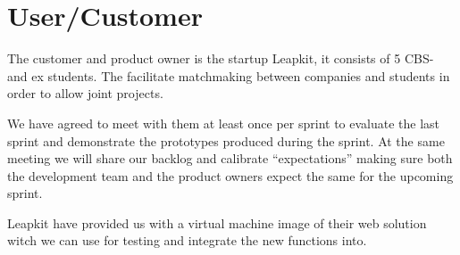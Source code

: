 \section{User/Customer}

The customer and product owner is the startup Leapkit, it consists of 5 CBS- and ex students. The facilitate matchmaking between companies and students in order to allow joint projects.

We have agreed to meet with them at least once per sprint to evaluate the last sprint and demonstrate the prototypes produced during the sprint. At the same meeting we will share our backlog and calibrate ``expectations'' making sure both the development team and the product owners expect the same for the upcoming sprint.

Leapkit have provided us with a virtual machine image of their web solution witch we can use for testing and integrate the new functions into.